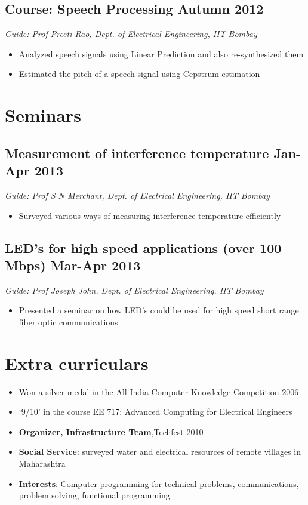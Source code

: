 \documentclass[11pt]{article}
\begin{document}
\subsection*{Course: Speech Processing \hfill Autumn 2012}
\emph{Guide: Prof Preeti Rao, Dept. of Electrical Engineering, IIT Bombay}
\begin{itemize}
\item Analyzed speech signals using Linear Prediction and also re-synthesized them
\item Estimated the pitch of a speech signal using Cepstrum estimation
\end{itemize}


\section*{Seminars}

\subsection*{Measurement of interference temperature \hfill  Jan-Apr 2013} 
\emph{Guide: Prof S N Merchant, Dept. of Electrical Engineering, IIT Bombay}
\begin{itemize}  
\item Surveyed various ways of measuring interference temperature efficiently 
\end{itemize}
  
\subsection*{LED's for high speed applications (over 100 Mbps) \hfill  Mar-Apr 2013}
\emph{Guide: Prof Joseph John, Dept. of Electrical Engineering, IIT Bombay}  
\begin{itemize}  
\item Presented a seminar on how LED's could be used for high speed short range fiber optic communications\end{itemize}



\section*{Extra curriculars}

\begin{itemize}
\item Won a silver medal in the All India Computer Knowledge Competition 2006 
\item `9/10' in the course EE 717: Advanced Computing for Electrical Engineers 
\item \textbf{Organizer, Infrastructure Team},Techfest 2010 
\item \textbf{Social Service}: surveyed water and electrical resources of remote villages in Maharashtra 
\item \textbf{Interests}:  Computer programming for technical problems, communications, problem solving, functional programming 
\end{itemize}
\end{document}
